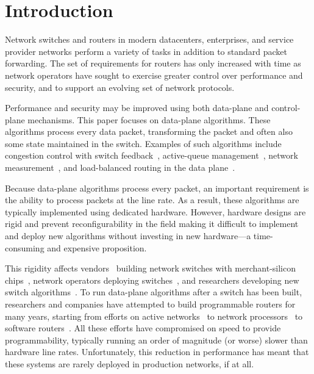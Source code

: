 \section{Introduction}
\label{s:intro}

Network switches and routers in modern datacenters, enterprises, and service
provider networks perform a variety of tasks in addition to standard packet
forwarding. The set of requirements for routers has only increased with time as
network operators have sought to exercise greater control over performance and
security, and to support an evolving set of network protocols.

Performance and security may be improved using both data-plane and
control-plane mechanisms. This paper focuses on data-plane algorithms. These
algorithms process every data packet, transforming the packet and often also
some state maintained in the switch.  Examples of such algorithms include
congestion control with switch feedback~\cite{xcp, rcp, pdq, dctcp},
active-queue management~\cite{red,blue,avq,codel,pie}, network
measurement~\cite{opensketch, bitmap_george, elephant_george}, and
load-balanced routing in the data plane~\cite{conga}.

Because data-plane algorithms process every packet, an important requirement is
the ability to process packets at the line rate.  As a result, these algorithms
are typically implemented using dedicated hardware. However, hardware designs
are rigid and prevent reconfigurability in the field making it difficult to
implement and deploy new algorithms without investing in new hardware---a
time-consuming and expensive proposition.

This rigidity affects vendors~\cite{cisco_nexus, dell_force10, arista_7050}
building network switches with merchant-silicon chips~\cite{trident, tomahawk,
mellanox}, network operators deploying switches~\cite{google,facebook,vl2}, and
researchers developing new switch algorithms~\cite{xcp, codel, d3, detail,
pdq}.  To run data-plane algorithms after a switch has been built, researchers
and companies have attempted to build programmable routers for many years,
starting from efforts on active networks~\cite{active-nets} to network
processors~\cite{npu_survey} to software routers~\cite{click,routebricks}. All
these efforts have compromised on speed to provide programmability, typically
running an order of magnitude (or worse) slower than hardware line rates.
Unfortunately, this reduction in performance has meant that these systems are
rarely deployed in production networks, if at all.

